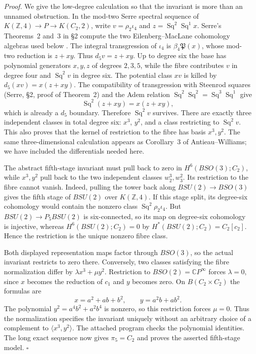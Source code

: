 \emph{Proof.} We give the low-degree calculation so that the invariant is more than an unnamed obstruction. In the mod-two Serre spectral sequence of
$K(\mathbb Z,4)\to P\to K(C_2,2)$, write $v=\rho_2\iota_4$ and $z=\operatorname{Sq}^2\operatorname{Sq}^1x$. Serre's Theorems~2 and~3 in \S2 compute the two Eilenberg--MacLane cohomology algebras used below \citep{Serre1953}. The integral transgression of $\iota_4$ is $\beta_4\mathfrak P(x)$, whose mod-two reduction is $z+xy$. Thus $d_5v=z+xy$. Up to degree six the base has polynomial generators $x,y,z$ of degrees $2,3,5$, while the fibre contributes $v$ in degree four and $\operatorname{Sq}^2v$ in degree six. The potential class $xv$ is killed by $d_5(xv)=x(z+xy)$. The compatibility of transgression with Steenrod squares (Serre, \S2, proof of Theorem~2) and the Adem relation $\operatorname{Sq}^2\operatorname{Sq}^2=\operatorname{Sq}^3\operatorname{Sq}^1$ give
\[
\operatorname{Sq}^2(z+xy)=x(z+xy),
\]
which is already a $d_5$ boundary. Therefore $\operatorname{Sq}^2v$ survives. There are exactly three independent classes in total degree six: $x^3$, $y^2$, and a class restricting to $\operatorname{Sq}^2v$. This also proves that the kernel of restriction to the fibre has basis $x^3,y^2$. The same three-dimensional calculation appears as Corollary~3 of Antieau--Williams; we have included the differentials needed here.

The abstract fifth-stage invariant must pull back to zero in $H^6(BSO(3);C_2)$, while $x^3,y^2$ pull back to the two independent classes $w_2^3,w_3^2$. Its restriction to the fibre cannot vanish. Indeed, pulling the tower back along $BSU(2)\to BSO(3)$ gives the fifth stage of $BSU(2)$ over $K(\mathbb Z,4)$. If this stage split, its degree-six cohomology would contain the nonzero class $\operatorname{Sq}^2\rho_2\iota_4$. But $BSU(2)\to P_5BSU(2)$ is six-connected, so its map on degree-six cohomology is injective, whereas $H^6(BSU(2);C_2)=0$ by $H^*(BSU(2);C_2)=C_2[c_2]$. Hence the restriction is the unique nonzero fibre class.

Both displayed representation maps factor through $BSO(3)$, so the actual invariant restricts to zero there. Conversely, two classes satisfying the fibre normalization differ by $\lambda x^3+\mu y^2$. Restriction to $BSO(2)=\mathbb CP^\infty$ forces $\lambda=0$, since $x$ becomes the reduction of $c_1$ and $y$ becomes zero. On $B(C_2\times C_2)$ the formulas are
\[
x=a^2+ab+b^2,\qquad y=a^2b+ab^2.
\]
The polynomial $y^2=a^4b^2+a^2b^4$ is nonzero, so this restriction forces $\mu=0$. Thus the normalization specifies the invariant uniquely without an arbitrary choice of a complement to $\langle x^3,y^2\rangle$. The attached program checks the polynomial identities. The long exact sequence now gives $\pi_5=C_2$ and proves the asserted fifth-stage model. \hfill$\square$

